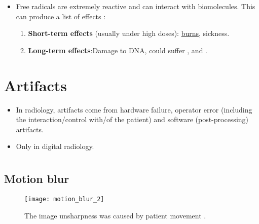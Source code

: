 \begin{itemize}
\item Free radicals are extremely reactive and can interact with
  biomolecules. This can produce a list of effects
  \cite{bushberg2011essential}:
  \begin{enumerate}
  \item \textbf{Short-term effects} (usually under high doses):
    \href{https://en.wikipedia.org/wiki/Radiation_burn}{burns},
    sickness.
  \item \textbf{Long-term effects}:Damage to DNA, could suffer
    , and .
  \end{enumerate}
\end{itemize}

\section{Artifacts}
\begin{itemize}
\item In radiology, artifacts come from hardware failure, operator
  error (including the interaction/control with/of the patient) and
  software (post-processing) artifacts.
\item Only in digital radiology.
\end{itemize}

\section*{}
\subsection{Motion blur}
\vspace{-4ex}
\begin{figure}[!h]
  \centering
  \texttt{[image: motion\_blur\_2]}
  \caption{The image unsharpness was caused by patient movement
    \cite{radiology_key}.\label{fig:motion_blur}}
\end{figure}

\section*{}
